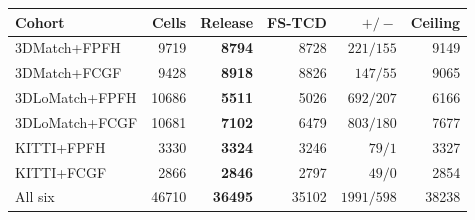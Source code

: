 \footnotesize\setlength{\tabcolsep}{3pt}%
\begin{tabular}{@{}lrrrrr@{}}
\toprule
Cohort & Cells & Release & FS-TCD & $+/{-}$ & Ceiling \\
\midrule
3DMatch+FPFH & 9719 & \textbf{8794} & 8728 & $221/155$ & 9149 \\
3DMatch+FCGF & 9428 & \textbf{8918} & 8826 & $147/55$ & 9065 \\
3DLoMatch+FPFH & 10686 & \textbf{5511} & 5026 & $692/207$ & 6166 \\
3DLoMatch+FCGF & 10681 & \textbf{7102} & 6479 & $803/180$ & 7677 \\
KITTI+FPFH & 3330 & \textbf{3324} & 3246 & $79/1$ & 3327 \\
KITTI+FCGF & 2866 & \textbf{2846} & 2797 & $49/0$ & 2854 \\
\midrule
All six & 46710 & \textbf{36495} & 35102 & $1991/598$ & 38238 \\
\bottomrule
\end{tabular}%
